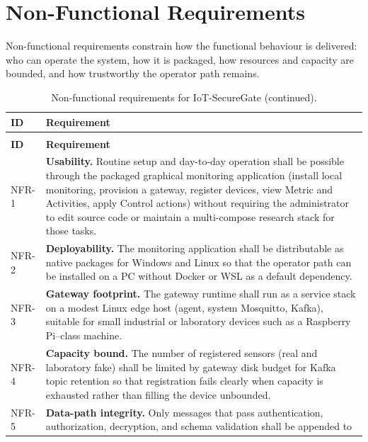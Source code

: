 \documentclass[12pt,a4paper]{report}
\begin{document}
\section{Non-Functional Requirements}

Non-functional requirements constrain how the functional
behaviour is delivered: who can operate the system, how
it is packaged, how resources and capacity are bounded,
and how trustworthy the operator path remains.

\begin{longtable}{@{}p{1.6cm}p{\dimexpr\textwidth-1.6cm-4\tabcolsep\relax}@{}}
\caption{Non-functional requirements for IoT-SecureGate.}
\label{tab:nonfunctional-requirements}\\
\toprule
\textbf{ID} & \textbf{Requirement} \\
\midrule
\endfirsthead
\caption[]{Non-functional requirements for IoT-SecureGate
  (continued).}\\
\toprule
\textbf{ID} & \textbf{Requirement} \\
\midrule
\endhead
\bottomrule
\endlastfoot
NFR-1
& \textbf{Usability.}
  Routine setup and day-to-day operation shall be
  possible through the packaged graphical monitoring
  application (install local monitoring, provision a
  gateway, register devices, view Metric and Activities,
  apply Control actions) without requiring the
  administrator to edit source code or maintain a
  multi-compose research stack for those tasks. \\
\midrule
NFR-2
& \textbf{Deployability.}
  The monitoring application shall be distributable as
  native packages for Windows and Linux so that the operator path can
  be installed on a PC without Docker or WSL as a
  default dependency. \\
\midrule
NFR-3
& \textbf{Gateway footprint.}
  The gateway runtime shall run as a service stack on a
  modest Linux edge host (agent, system Mosquitto,
  Kafka), suitable for small industrial or laboratory
  devices such as a Raspberry Pi--class machine. \\
\midrule
NFR-4
& \textbf{Capacity bound.}
  The number of registered sensors (real and laboratory
  fake) shall be limited by gateway disk budget for
  Kafka topic retention so that registration fails
  clearly when capacity is exhausted rather than filling
  the device unbounded. \\
\midrule
NFR-5
& \textbf{Data-path integrity.}
  Only messages that pass authentication, authorization,
  decryption, and schema validation shall be appended to

\end{longtable}
\end{document}

